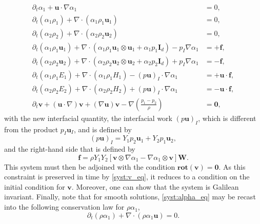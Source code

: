 \documentclass{myclass}
\newcommand{\Id}{\mathbf{I}_d}
\newcommand{\vel}{\bm{u}}
\newcommand{\lift}{\bm{f}}
\newcommand{\pth}[1]  {\left( #1 \right)}
\newcommand{\brck}[1]  {\left[ #1 \right]}
\newcommand{\rot}{\mathbf{rot}}
\begin{document}
\begin{subequations}
\begin{align}
\partial_t\alpha_1 + \vel\cdot\nabla\alpha_1 &=0, \label{syst:alpha_eq}\\
\partial_t \pth{\alpha_1\rho_1} + \nabla\cdot\pth{\alpha_1\rho_1 \vel_1} &=0,\\
\partial_t \pth{\alpha_2\rho_2} + \nabla\cdot\pth{\alpha_2\rho_2 \vel_2} &=0,\\
\partial_t\pth{\alpha_1\rho_1\vel_1} + \nabla\cdot\pth{\alpha_1\rho_1\vel_1\otimes\vel_1 + \alpha_1 p_1\Id} - p_I\nabla\alpha_1 &=+\lift,\\
\partial_t\pth{\alpha_2\rho_2\vel_2} + \nabla\cdot\pth{\alpha_2\rho_2\vel_2\otimes\vel_2 + \alpha_2 p_2\Id} + p_I\nabla\alpha_1 &=-\lift,\\
\partial_t\pth{\alpha_1\rho_1 E_1} + \nabla\cdot\pth{\alpha_1\rho_1 H_1} - \pth{p\vel}_I\cdot\nabla\alpha_1 &= + \vel\cdot\lift,\\
\partial_t\pth{\alpha_2\rho_2 E_2} + \nabla\cdot\pth{\alpha_2\rho_2 H_2} + \pth{p\vel}_I\cdot\nabla\alpha_1 &= - \vel\cdot\lift,\\
\partial_t \bm{v} + \pth{\vel\cdot\nabla}\bm{v} + \pth{\nabla\vel}\bm{v} - \nabla\pth{\frac{p_1-p_2}{\rho}} &= \bm{0},\label{syst:v_eq}
\end{align}\label{syst:energy_form_with_lift}
\end{subequations}
with the new interfacial quantity, the interfacial work $(p\vel)_I$, which is different from the product $p_I\vel_I$, and is defined by
\begin{equation}\label{eq:interfacial_work}
(p\vel)_I = Y_1 p_2 \vel_1 + Y_2 p_1 \vel_2,
\end{equation}
and the right-hand side that is defined by
\begin{equation}\label{eq:lift_expression}
\lift=\rho Y_1 Y_2 \brck{\bm{v}\otimes\nabla\alpha_1 - \nabla\alpha_1\otimes\bm{v}}\bm{W}.
\end{equation}
This system must then be adjoined with the condition $\rot(\bm{v})=\bm{0}$. As this constraint is preserved in time by \eqref{syst:v_eq}, it reduces to a condition on the initial condition for $\bm{v}$. Moreover, one can show that the system is Galilean invariant. Finally, note that for smooth solutions, \eqref{syst:alpha_eq} may be recast into the following conservation law for $\rho \alpha_1$,
\begin{equation}
\partial_t\pth{\rho\alpha_1} + \nabla\cdot\pth{\rho\alpha_1\vel} = 0.
\end{equation}
\end{document}
